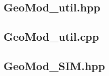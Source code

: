 \documentclass[a4paper, 12pt]{article}
\begin{document}
\subsection{GeoMod\_util.hpp} \label{subsec:util_hpp}

\subsection{GeoMod\_util.cpp} \label{subsec:util_cpp}


\subsection{GeoMod\_SIM.hpp} \label{subsec:SIM_hpp}

\end{document}
